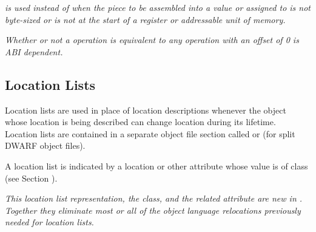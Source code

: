 \textit{\DWOPbitpieceNAME{} is 
used instead of \DWOPpieceNAME{} when
the piece to be assembled into a value or assigned to is not
byte-sized or is not at the start of a register or addressable
unit of memory.}

\bb
\textit{Whether or not a \DWOPpiece{} operation is equivalent to any 
\DWOPbitpiece{} operation with an offset of 0 is ABI dependent.}
\eb

\subsection{Location Lists}
\label{chap:locationlists}
Location lists are used in place of location descriptions whenever
the object whose location is being described can change location
during its lifetime. Location lists are contained in a separate
object file section called \dotdebugloclists{} or \dotdebugloclistsdwo{}
(for split DWARF object files).

A location list is indicated by a location or other attribute
whose value is of class \CLASSloclist{} 
(see Section ).
   
\textit{This location list representation, the \CLASSloclist{} class, and the
related \DWATloclistsbase{} attribute are new in \DWARFVersionV.
Together they eliminate most or all of the object language relocations
previously needed for location lists.}


